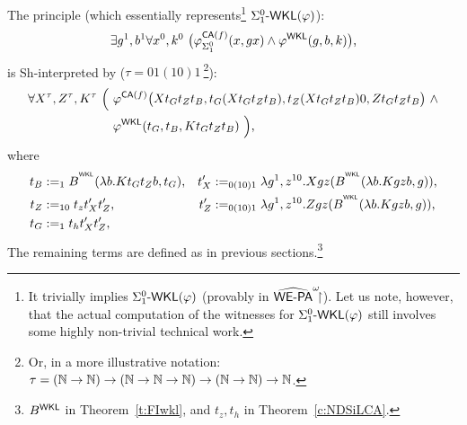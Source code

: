 \begin{lemma} \label{p:ND-PI02WKL}
$ $
\\
The principle (which essentially represents\footnote{
It trivially implies $\Sigma^0_1\textsf{\upshape -}\textsf{\upshape WKL}(\varphi)$ (provably in $\widehat{\textsf{\upshape WE-PA}}^\omega\!\!\!\restriction$). Let us note, 
however, that the actual computation of the witnesses for $\Sigma^0_1\textsf{\upshape -}\textsf{\upshape WKL}(\varphi)$ 
still involves some highly non-trivial technical work. 
}  $\Sigma^0_1\textsf{\upshape -}\textsf{\upshape WKL}(\varphi)$):
\[
\exists g^1,b^1\forall x^0,k^0\ \big( \varphi^{\textsf{\upshape CA}(f)}_{\Sigma^0_1}(x,gx)\wedge 
\varphi^{\textsf{\upshape WKL}}(g,b,k) \big)
\text{,}
\]
is Sh-interpreted by ($\tau=01(10)1\ $\footnote{Or, in a more illustrative 
notation: 
$\tau = (\mathbb{N} \rightarrow \mathbb{N}) \rightarrow (\mathbb{N} \rightarrow \mathbb{N} \rightarrow 
\mathbb{N}) \rightarrow (\mathbb{N} \rightarrow \mathbb{N}) \rightarrow \mathbb{N}$.}):
\begin{align*}
\forall X^\tau,Z^\tau,K^\tau\ \Big(\ &\varphi^{\textsf{\upshape CA}(f)}\big(
 Xt_{G}t_{Z}t_{B},
 t_{G}( Xt_{G}t_{Z}t_{B} ),
 t_{Z}( Xt_{G}t_{Z}t_{B} ) 0,
 Zt_Gt_Zt_{B}\big)\ \wedge\\
 &\varphi^{\textsf{\upshape WKL}}(t_{G},t_{B},Kt_{G}t_{Z}t_{B})\ \Big) \text{,}
\end{align*}
where
\newcommand{\tpA}{0(10)1}
\newcommand{\tpz}{10}
\begin{align*}
        t_B    &:=_1 B^{^\WKL}(\lambda b.Kt_Gt_Zb,t_G)\text{,}&
        t_{X}' &:=_{\tpA}\lambda g^1,z^{\tpz} . 
Xgz(B^{^\WKL}(\lambda b.Kgzb,g))\text{,}\\
        t_Z    &:=_{\tpz} t_zt_{X}'t_{Z}'\text{,}&
        t_{Z}' &:=_{\tpA}\lambda g^1,z^{\tpz} . 
Zgz(B^{^\WKL}(\lambda b.Kgzb,g))\text{,}\\ 
        t_G    &:=_1 t_ht_{X}'t_{Z}'\text{,}\\
\end{align*}
The remaining terms are defined as in previous sections.\footnote{
 $B^{\textsf{\upshape WKL}}$ in Theorem~\ref{t:FIwkl}, and $t_z,t_h$ in Theorem~\ref{c:NDSiLCA}.
}
\end{lemma}

